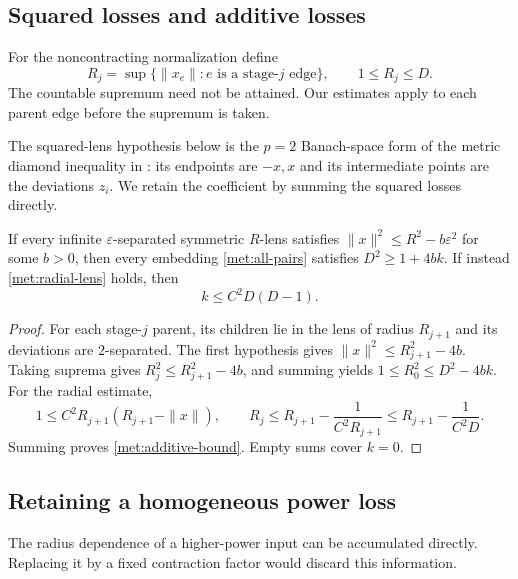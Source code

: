 \subsection{Squared losses and additive losses}\label{met:squared-section}
For the noncontracting normalization define
\[
 R_j=\sup\{\|x_e\|: e\text{ is a stage-$j$ edge}\},
 \qquad 1\le R_j\le D.
\]
The countable supremum need not be attained. Our estimates apply to each
parent edge before the supremum is taken.

The squared-lens hypothesis below is the $p=2$ Banach-space form of
the metric diamond inequality in
\cite[Equation~(2) and Theorem~3.7 of arXiv v2]{Malthaner2025}:
its endpoints are $-x,x$ and its intermediate points are the deviations
$z_i$. We retain the coefficient by summing the squared losses directly.

\begin{theorem}\label{met:squared-transfer}
If every infinite $\varepsilon$-separated symmetric $R$-lens satisfies
$\|x\|^2\le R^2-b\varepsilon^2$ for some $b>0$, then every embedding
\eqref{met:all-pairs} satisfies $D^2\ge1+4bk$.
If instead \eqref{met:radial-lens} holds, then
\begin{equation}\label{met:additive-bound}
 k\le C^2D(D-1).
\end{equation}
\end{theorem}
\begin{proof}
For each stage-$j$ parent, its children lie in the lens of radius
$R_{j+1}$ and its deviations are $2$-separated. The first hypothesis
gives $\|x\|^2\le R_{j+1}^2-4b$. Taking suprema gives
$R_j^2\le R_{j+1}^2-4b$, and summing yields
$1\le R_0^2\le D^2-4bk$.
For the radial estimate,
\[
 1\le C^2R_{j+1}(R_{j+1}-\|x\|),\qquad
 R_j\le R_{j+1}-\frac1{C^2R_{j+1}}
 \le R_{j+1}-\frac1{C^2D}.
\]
Summing proves \eqref{met:additive-bound}. Empty sums cover $k=0$.
\end{proof}

\subsection{Retaining a homogeneous power loss}
The radius dependence of a higher-power input can be accumulated directly.
Replacing it by a fixed contraction factor would discard this information.

